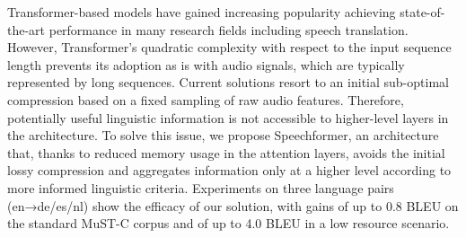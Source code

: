 Transformer-based models have gained increasing popularity achieving state-of-the-art performance in many research fields including speech translation. However, Transformer's quadratic complexity with respect to the input sequence length prevents its adoption as is with audio signals, which are typically represented by long sequences. Current solutions resort to an initial sub-optimal compression based on a fixed sampling of raw audio features. Therefore, potentially useful linguistic information is not accessible to higher-level layers in the architecture. To solve this issue, we propose Speechformer, an architecture that, thanks to reduced memory usage in the attention layers, avoids the initial lossy compression and aggregates information only at a higher level according to more informed linguistic criteria. Experiments on three language pairs (en→de/es/nl) show the efficacy of our solution, with gains of up to 0.8 BLEU on the standard MuST-C corpus and of up to 4.0 BLEU in a low resource scenario.
